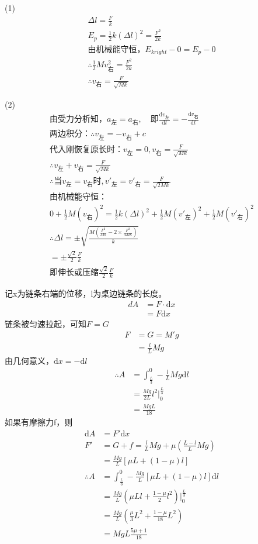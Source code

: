 \documentclass[b5paper,opensource]{qyxf-book}
\newcommand{\di}[1]{\mathrm{d}#1}
\newcommand{\dy}[2]{\frac{\di{#1}}{\di{#2}}}
\begin{document}
(1)
\begin{gather*}
\Delta l=\frac{F}{k}\\
E_p=\frac{1}{2}k(\Delta l)^2=\frac{F^2}{2k}\\
\text{由机械能守恒，}E_{kright}-0=E_p-0\\
\therefore\frac{1}{2}Mv_{\text{右}}^2=\frac{F^2}{2k}\\
\therefore v_{\text{右}}=\frac{F}{\sqrt{Mk}}
\end{gather*}

(2)
\begin{gather*}
\text{由受力分析知，}a_{\text{左}}=a_{\text{右}},\quad\text{即}\dy{v_{\text{左}}}{t}=-\dy{v_{\text{右}}}{t}\\
\text{两边积分：}\therefore v_{\text{左}}=-v_{\text{右}}+c\\
\text{代入刚恢复原长时：}v_{\text{左}}=0,v_{\text{右}}=\frac{F}{\sqrt{Mk}}\\
\therefore v_{\text{左}}+v_{\text{右}}=\frac{F}{\sqrt{Mk}}\\
\therefore\text{当}v_{\text{左}}=v_{\text{右}}\text{时},v'_{\text{左}}=v'_{\text{右}}=\frac{F}{\sqrt{2Mk}}\\
\text{由机械能守恒：}\\
0+\frac{1}{2}M(v_{\text{右}})^2=\frac{1}{2}k(\Delta l)^2+\frac{1}{2}M(v'_{\text{左}})^2+\frac{1}{2}M(v'_{\text{右}})^2\\
\therefore\Delta l=\pm\sqrt{\frac{M\left(\frac{F^2}{Mk}-2\times\frac{F^2}{4Mk}\right)}{k}}\\
=\pm\frac{\sqrt{2}}{2}\frac{F}{k}\\
\text{即伸长或压缩}\frac{\sqrt{2}}{2}\frac{F}{k}
\end{gather*}

 记x为链条右端的位移，l为桌边链条的长度。
\begin{align*}
dA	&=F\cdot\di{x}\\
&=F\di{x}
\end{align*}
链条被匀速拉起，可知$F=G$
\begin{align*}
F	&=G=M'g\\
&=\frac{l}{L}Mg
\end{align*}
由几何意义，$\di{x}=-\di{l}$
\begin{align*}
\therefore A&=\int_{\frac{L}{3}}^{0} -\frac{l}{L}Mg\di{l}\\
&=\frac{Mg}{2L}l^2\left.\right|_{0}^{\frac{L}{3}}\\
&=\frac{MgL}{18}
\end{align*}
如果有摩擦力f，则
\begin{align*}
\di{A}	&=F'\di{x}\\
F'		&=G+f=\frac{l}{L}Mg+\mu\left(\frac{L-l}{L}Mg\right)\\
&=\frac{Mg}{L}[\mu L+(1-\mu)l]\\
\therefore A&=\int_{\frac{L}{3}}^{0} -\frac{Mg}{L}[\mu L+(1-\mu)l] \di{l}\\
&=\frac{Mg}{L}\left(\mu Ll+\frac{1-\mu}{2}l^2\right)\left.\right|_{0}^{\frac{L}{3}}\\
&=\frac{Mg}{L}\left(\frac{\mu}{3}L^2+\frac{1-\mu}{18}L^2\right)\\
&=MgL\frac{5\mu +1}{18}
\end{align*}
\end{document}
